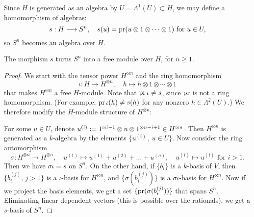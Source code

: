Since $H$ is generated as an algebra by $U=\Lambda^1(U)\subset H$, we may define a homomorphism of algebras:
$$ s : H \longrightarrow S^n, \quad s(u) = \operatorname{pr}( u \otimes 1\otimes\cdots\otimes 1)\text{ for }u\in U, $$
so $S^n$ becomes an algebra over $H$.
\begin{lemma}
\label{SuperFree}
The morphism $s$ turns $S^n$ into a free module over $H$, for $n\geq 1$.
\end{lemma}
\begin{proof}
We start with the tensor power $H^{\otimes n}$ and the ring homomorphism 
$$
\iota : H \longrightarrow H^{\otimes n},\quad h\longmapsto h\otimes 1\otimes\cdots\otimes 1
$$
that makes $H^{\otimes n}$ a free $H$-module. Note that $\operatorname{pr} \iota \neq s$, since $\operatorname{pr}$ is not a ring homomorphism.
(For example, $\operatorname{pr}\iota(h)\neq s(h)$ for any nonzero $h\in\Lambda^2(U)$.)
We therefore modify the $H$-module structure of $H^{\otimes n}$:

For some $u\in U$, denote $u^{(i)} \vcentcolon=  1^{\otimes i-1}\otimes u\otimes 1^{\otimes n-i+1} \in H^{\otimes n}$. Then $H^{\otimes n}$ is generated as a $k$-algebra by the elements $\{u^{(i)}\,,\,u\in U\}$. Now consider the ring automorphism
$$
\sigma : H^{\otimes n} \longrightarrow H^{\otimes n}, \quad u^{(1)} \longmapsto u^{(1)} +u^{(2)} + \ldots + u^{(n)}, \quad
u^{(i)} \longmapsto u^{(i)} \text{ for } i>1.
$$
Then we have $\sigma\iota = s$ on $S^n$. On the other hand, if $\{b_i\}$ is a $k$-basis of $V$, then $\{b_i^{(j)},\,j>1\} $ is a $\iota$-basis for $H^{\otimes n}$, and $\{\sigma(b_i^{(j)})\}$ is a $\sigma\iota$-basis for $H^{\otimes n}$.
Now if we project the basis elements, we get a set $\{\operatorname{pr}(\sigma(b_i^{(j)}))\}$ that spans $S^n$. Eliminating linear dependent vectors (this is possible over the rationals), we get a $s$-basis of $S^n$.
\end{proof}

